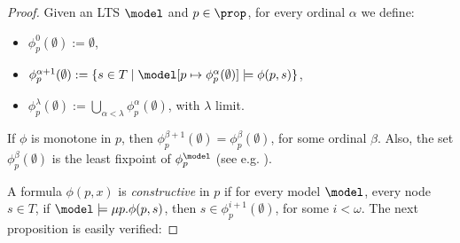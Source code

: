\begin{proof}
%
%
%

\noindent Given an LTS $\model$ and $p\in \prop$, for every ordinal $\alpha$ we define: %
 \begin{itemize}
\item $\phi^0_p(\emptyset):= \emptyset$,
\item $\phi_p^{\alpha+1}(\emptyset):= \{ s \in T \mid \model[p \mapsto \phi_p^\alpha(\emptyset)] \models \phi(p, s)\}$,
\item $\phi_p^{\lambda}(\emptyset):= \bigcup_{\alpha < \lambda} \phi_p^{\alpha}(\emptyset)$, with $\lambda$ limit.
\end{itemize}
If $\phi$ is monotone in $p$, then $\phi_p^{\beta+1}(\emptyset)= \phi_p^{\beta}(\emptyset)$, for some ordinal $\beta$. Also, the set $\phi_p^{\beta}(\emptyset)$ is the least fixpoint of $\phi^\model_p$ (see e.g. \cite{ArnoldN01}).



 A formula $\phi(p, x)$ is \emph{constructive} in $p$ if for every model $\model$,  every node $s \in T$, if $\model \models\mu p. \phi(p,s)$, then $s\in \phi_p^{i+1}(\emptyset)$, for some $i< \omega$.
The next proposition is easily verified:%




\end{proof}
